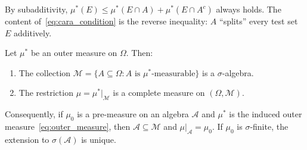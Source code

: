 \documentclass[11pt,a4paper]{article}
\begin{document}
\begin{remark}
By subadditivity, $\mu^*(E) \leq \mu^*(E \cap A) + \mu^*(E \cap A^c)$
always holds. The content of~\eqref{eq:cara_condition} is the reverse
inequality: $A$ ``splits'' every test set $E$ additively.
\end{remark}

\begin{keyresult}[title={Carath\'{e}odory Extension Theorem}]
\begin{theorem}
\label{thm:caratheodory}
Let $\mu^*$ be an outer measure on $\Omega$. Then:
\begin{enumerate}[nosep,label=(\alph*)]
  \item The collection $\mathcal{M} = \{A \subseteq \Omega :
    A \text{ is $\mu^*$-measurable}\}$ is a $\sigma$-algebra.
  \item The restriction $\mu = \mu^*|_{\mathcal{M}}$ is a complete
    measure on $(\Omega, \mathcal{M})$.
\end{enumerate}
Consequently, if $\mu_0$ is a pre-measure on an algebra $\mathcal{A}$
and $\mu^*$ is the induced outer measure~\eqref{eq:outer_measure},
then $\mathcal{A} \subseteq \mathcal{M}$ and
$\mu|_{\mathcal{A}} = \mu_0$. If $\mu_0$ is $\sigma$-finite, the
extension to $\sigma(\mathcal{A})$ is unique.
\end{theorem}
\end{keyresult}
\end{document}
